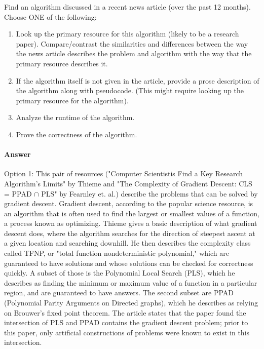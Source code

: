 \documentclass{article}
\begin{document}

Find an algorithm discussed in a recent news article (over the past 12 months).
Choose ONE of the following:
\begin{enumerate}
    \item Look up the primary resource for this algorithm (likely to be a
        research paper).  Compare/contrast the similarities and differences between the
        way the news article describes the problem and algorithm with the way
        that the primary resource describes it.
    \item If the algorithm itself is not given in the article, provide a prose
        description of the algorithm along with pseudocode. (This might require
        looking up the primary resource for the algorithm).
    \item Analyze the runtime of the algorithm.
    \item Prove the correctness of the algorithm.
\end{enumerate}

\paragraph{Answer}
Option 1: This pair of resources ("Computer Scientistis Find a Key Research Algorithm's Limits" by Thieme and "The Complexity of Gradient Descent: CLS = PPAD $\cap$ PLS" by Fearnley et. al.) describe the problems that can be solved by gradient descent. Gradient descent, according to the popular science resource, is an algorithm that is often used to find the largest or smallest values of a function, a process known as optimizing. Thieme gives a basic description of what gradient descent does, where the algorithm searches for the direction of steepest ascent at a given location and searching downhill. He then describes the complexity class called TFNP, or "total function nondeterministic polynomial," which are guaranteed to have solutions and whose solutions can be checked for correctness quickly. A subset of those is the Polynomial Local Search (PLS), which he describes as finding the minimum or maximum value of a function in a particular region, and are guaranteed to have answers. The second subset are PPAD (Polynomial Parity Arguments on Directed graphs), which he describes as relying on Brouwer's fixed point theorem. The article states that the paper found the intersection of PLS and PPAD contains the gradient descent problem; prior to this paper, only artificial constructions of problems were known to exist in this intersection.
\end{document}
